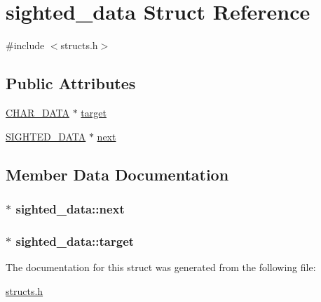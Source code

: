 \hypertarget{structsighted__data}{\section{sighted\-\_\-data Struct Reference}
\label{structsighted__data}
}


{\ttfamily \#include $<$structs.\-h$>$}

\subsection*{Public Attributes}
\begin{DoxyCompactItemize}
\item 
\hyperlink{structs_8h_af33ed1e66e8541a08bed257124f50f31}{C\-H\-A\-R\-\_\-\-D\-A\-T\-A} $\ast$ \hyperlink{structsighted__data_a22ad34f9af75e023eb149ffdba2fd59b}{target}
\item 
\hyperlink{structs_8h_ae81f55dce9668a8e25cb7d6b3c2d6cce}{S\-I\-G\-H\-T\-E\-D\-\_\-\-D\-A\-T\-A} $\ast$ \hyperlink{structsighted__data_af7e3404f0cfd3687d2548ac87f34afe8}{next}
\end{DoxyCompactItemize}


\subsection{Member Data Documentation}
\hypertarget{structsighted__data_af7e3404f0cfd3687d2548ac87f34afe8}{
\subsubsection[{next}]{$\ast$ sighted\-\_\-data\-::next}}\label{structsighted__data_af7e3404f0cfd3687d2548ac87f34afe8}
\hypertarget{structsighted__data_a22ad34f9af75e023eb149ffdba2fd59b}{
\subsubsection[{target}]{$\ast$ sighted\-\_\-data\-::target}}\label{structsighted__data_a22ad34f9af75e023eb149ffdba2fd59b}


The documentation for this struct was generated from the following file\-:\begin{DoxyCompactItemize}
\item 
\hyperlink{structs_8h}{structs.\-h}\end{DoxyCompactItemize}
